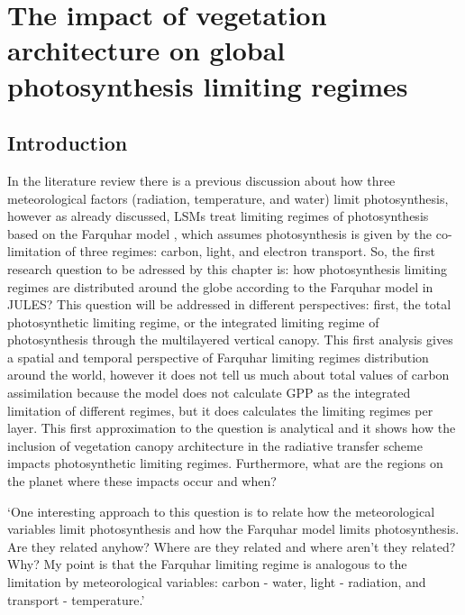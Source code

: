 \documentclass[a4paper,11pt]{report}
\title{}
\author{Renato Kerches Braghiere \\ This document was written in \LaTeX \\ Number of words: 12213}
\date{\today}
\begin{document}
\maketitle
\setcounter{chapter}{5} %

\chapter{The impact of vegetation architecture on global photosynthesis limiting regimes}

\section{Introduction}\label{introduction}

In the literature review there is a previous discussion about how three meteorological factors (radiation, temperature, and water) limit photosynthesis, however as already discussed, LSMs treat limiting regimes of photosynthesis based on the Farquhar model \citep{Farquhar1980}, which assumes photosynthesis is given by the co-limitation of three regimes: carbon, light, and electron transport. So, the first research question to be adressed by this chapter is: how photosynthesis limiting regimes are distributed around the globe according to the Farquhar model in JULES? This question will be addressed in different perspectives: first, the total photosynthetic limiting regime, or the integrated limiting regime of photosynthesis through the multilayered vertical canopy. This first analysis gives a spatial and temporal perspective of Farquhar limiting regimes distribution around the world, however it does not tell us much about total values of carbon assimilation because the model does not calculate GPP as the integrated limitation of different regimes, but it does calculates the limiting regimes per layer. This first approximation to the question is analytical and it shows how the inclusion of vegetation canopy architecture in the radiative transfer scheme impacts photosynthetic limiting regimes. Furthermore, what are the regions on the planet where these impacts occur and when?

`One interesting approach to this question is to relate how the meteorological variables limit photosynthesis and how the Farquhar model limits photosynthesis. Are they related anyhow? Where are they related and where aren't they related? Why? My point is that the Farquhar limiting regime is analogous to the limitation by meteorological variables: carbon - water, light - radiation, and transport - temperature.'
\end{document}
